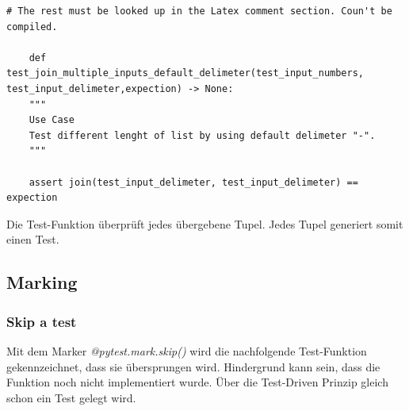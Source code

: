 \begin{lstlisting}[style=python, caption={Bsp.: Parametrizing test function pytest - Part II}, captionpos=b]
	# The rest must be looked up in the Latex comment section. Coun't be compiled.
	
	def test_join_multiple_inputs_default_delimeter(test_input_numbers, test_input_delimeter,expection) -> None:
	"""
	Use Case
	Test different lenght of list by using default delimeter "-".
	"""
	
	assert join(test_input_delimeter, test_input_delimeter) == expection
\end{lstlisting}

Die Test-Funktion überprüft jedes übergebene Tupel. Jedes Tupel generiert somit einen Test.


\subsection{Marking}
\subsubsection{Skip a test}
Mit dem Marker \textit{@pytest.mark.skip()} wird die nachfolgende Test-Funktion gekennzeichnet, dass sie übersprungen wird. Hindergrund kann sein, dass die Funktion noch nicht implementiert wurde. Über die Test-Driven Prinzip gleich schon ein Test gelegt wird.

